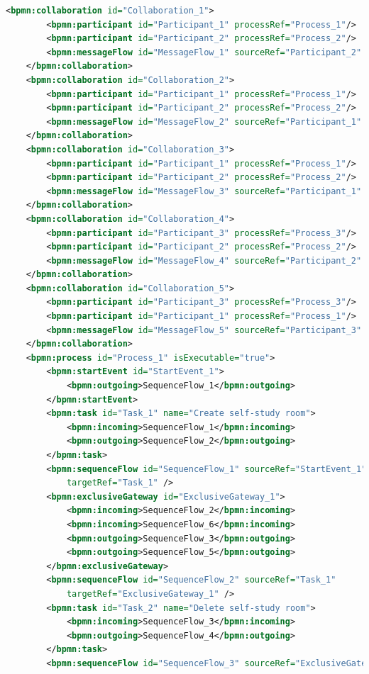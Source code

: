 \documentclass[runningheads]{llncs}
\begin{document}
    \begin{lstlisting}[language={XML}]
    <bpmn:collaboration id="Collaboration_1">
		<bpmn:participant id="Participant_1" processRef="Process_1"/>
		<bpmn:participant id="Participant_2" processRef="Process_2"/>
		<bpmn:messageFlow id="MessageFlow_1" sourceRef="Participant_2" targetRef="Participant_1"/>
	</bpmn:collaboration>
	<bpmn:collaboration id="Collaboration_2">
		<bpmn:participant id="Participant_1" processRef="Process_1"/>
		<bpmn:participant id="Participant_2" processRef="Process_2"/>
		<bpmn:messageFlow id="MessageFlow_2" sourceRef="Participant_1" targetRef="Participant_2"/>
	</bpmn:collaboration>
	<bpmn:collaboration id="Collaboration_3">
		<bpmn:participant id="Participant_1" processRef="Process_1"/>
		<bpmn:participant id="Participant_2" processRef="Process_2"/>
		<bpmn:messageFlow id="MessageFlow_3" sourceRef="Participant_1" targetRef="Participant_2"/>
	</bpmn:collaboration>
	<bpmn:collaboration id="Collaboration_4">
		<bpmn:participant id="Participant_3" processRef="Process_3"/>
		<bpmn:participant id="Participant_2" processRef="Process_2"/>
		<bpmn:messageFlow id="MessageFlow_4" sourceRef="Participant_2" targetRef="Participant_3"/>
	</bpmn:collaboration>
	<bpmn:collaboration id="Collaboration_5">
		<bpmn:participant id="Participant_3" processRef="Process_3"/>
		<bpmn:participant id="Participant_1" processRef="Process_1"/>
		<bpmn:messageFlow id="MessageFlow_5" sourceRef="Participant_3" targetRef="Participant_1"/>
	</bpmn:collaboration>
	<bpmn:process id="Process_1" isExecutable="true">
		<bpmn:startEvent id="StartEvent_1">
	        <bpmn:outgoing>SequenceFlow_1</bpmn:outgoing>
	    </bpmn:startEvent>
		<bpmn:task id="Task_1" name="Create self-study room">
	        <bpmn:incoming>SequenceFlow_1</bpmn:incoming>
	        <bpmn:outgoing>SequenceFlow_2</bpmn:outgoing>
	    </bpmn:task>
		<bpmn:sequenceFlow id="SequenceFlow_1" sourceRef="StartEvent_1"
	        targetRef="Task_1" />
		<bpmn:exclusiveGateway id="ExclusiveGateway_1">
			<bpmn:incoming>SequenceFlow_2</bpmn:incoming>
			<bpmn:incoming>SequenceFlow_6</bpmn:incoming>
	        <bpmn:outgoing>SequenceFlow_3</bpmn:outgoing>
			<bpmn:outgoing>SequenceFlow_5</bpmn:outgoing>
		</bpmn:exclusiveGateway>
		<bpmn:sequenceFlow id="SequenceFlow_2" sourceRef="Task_1"
	        targetRef="ExclusiveGateway_1" />
		<bpmn:task id="Task_2" name="Delete self-study room">
	        <bpmn:incoming>SequenceFlow_3</bpmn:incoming>
	        <bpmn:outgoing>SequenceFlow_4</bpmn:outgoing>
	    </bpmn:task>
		<bpmn:sequenceFlow id="SequenceFlow_3" sourceRef="ExclusiveGateway_1"

\end{lstlisting}
\end{document}
